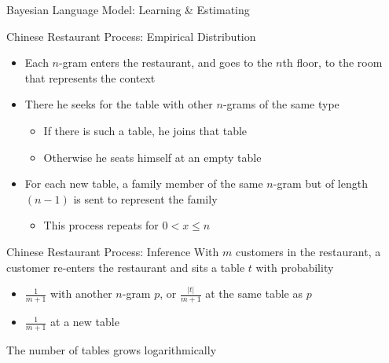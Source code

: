 \begin{frame}{Bayesian Language Model: Learning \& Estimating}
    \begin{block}{Chinese Restaurant Process: Empirical Distribution}
        \begin{itemize}
            \item Each $n$-gram enters the restaurant, and goes to the $n$th floor, to the room that represents the context
            \item There he seeks for the table with other $n$-grams of the same type
                \begin{itemize}
                    \item If there is such a table, he joins that table
                    \item Otherwise he seats himself at an empty table
                \end{itemize}
            \item For each new table, a family member of the same $n$-gram but of length $(n-1)$ is sent to represent the family
                \begin{itemize}
                    \item This process repeats for $0 < x \leq n$
                \end{itemize}
        \end{itemize}
    \end{block}

    \begin{block}{Chinese Restaurant Process: Inference}
        With $m$ customers in the restaurant, a customer re-enters the restaurant and sits a table $t$ with probability
        \begin{itemize}
            \item $\frac{1}{m+1}$ with another $n$-gram $p$, or $\frac{|t|}{m+1}$ at the same table as $p$
            \item $\frac{1}{m+1}$ at a new table
        \end{itemize}
        The number of tables grows logarithmically
    \end{block}
\end{frame}

